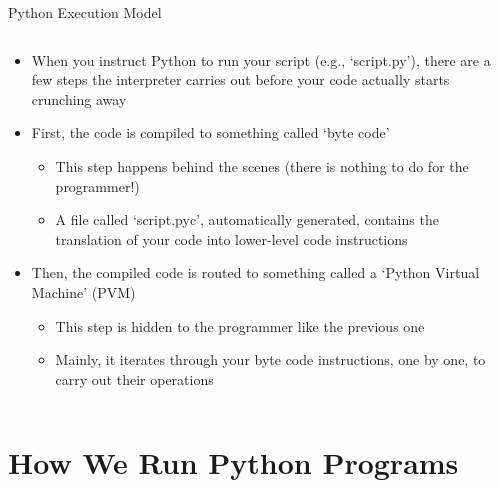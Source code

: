 \documentclass[aspectratio=1610]{beamer}
\begin{document}
\begin{frame}[c]{Python Execution Model}
	\begin{columns}
		\begin{column}{0.6\textwidth}
			\begin{itemize}
				\item When you instruct Python to run your script (e.g., `script.py'), there are a few steps the interpreter carries out before your code actually starts crunching away
				\item First, the code is compiled to something called `byte code'
				\begin{itemize}
					\item This step happens behind the scenes (there is nothing to do for the programmer!)
      					\item A file called `script.pyc', automatically generated, contains the translation of your code into lower-level code instructions
				\end{itemize}
				\item Then, the compiled code is routed to something called a `Python Virtual Machine' (PVM)
				\begin{itemize}
					\item This step is hidden to the programmer like the previous one
					\item Mainly, it iterates through your byte code instructions, one by one, to carry out their operations
			\end{itemize}
				\end{itemize}
		\end{column}
		\begin{column}{0.4\textwidth}
			\centering
		\end{column}
	\end{columns}
\end{frame}

\section{How We Run Python Programs}
\end{document}
